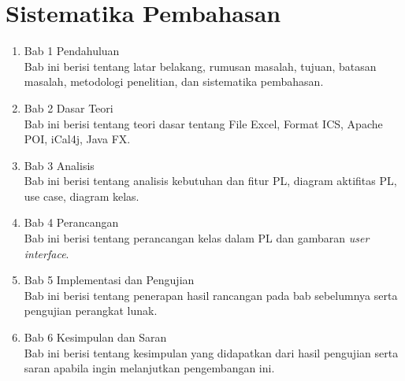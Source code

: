 \section{Sistematika Pembahasan}
\label{sec:sispem}
\begin{enumerate}
	\item Bab 1 Pendahuluan\\
	Bab ini berisi tentang latar belakang, rumusan masalah, tujuan, batasan masalah, metodologi penelitian, dan sistematika pembahasan.
	\item Bab 2 Dasar Teori\\
	Bab ini berisi tentang teori dasar tentang File Excel, Format ICS, Apache POI, iCal4j, Java FX.
	\item Bab 3 Analisis\\
	Bab ini berisi tentang analisis kebutuhan dan fitur PL, diagram aktifitas PL, use case, diagram kelas.
	\item Bab 4 Perancangan\\
	Bab ini berisi tentang perancangan kelas dalam PL dan gambaran \textit{user interface}.
	\item Bab 5 Implementasi dan Pengujian\\
	Bab ini berisi tentang penerapan hasil rancangan pada bab sebelumnya serta pengujian perangkat lunak.
	\item Bab 6 Kesimpulan dan Saran\\
	Bab ini berisi tentang kesimpulan yang didapatkan dari hasil pengujian serta saran apabila ingin melanjutkan pengembangan ini.
\end{enumerate}